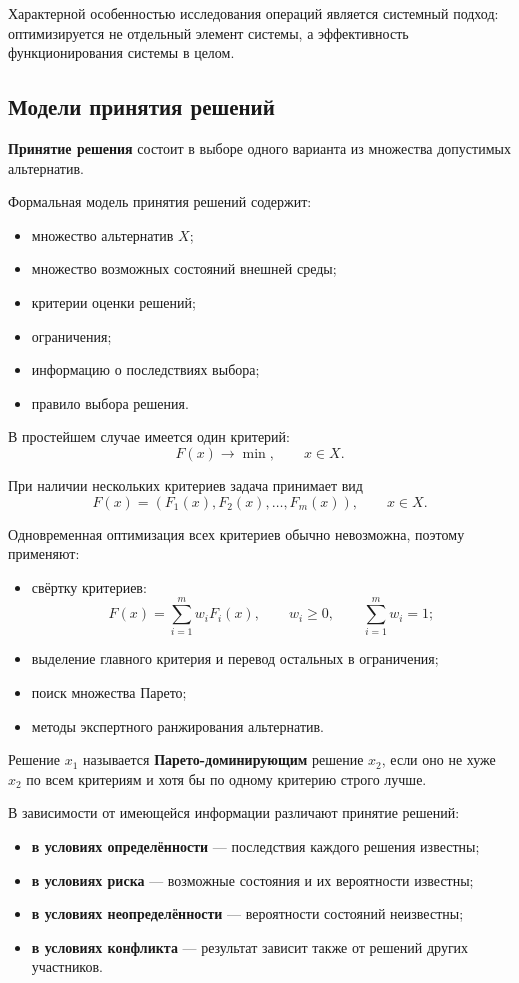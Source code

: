 Характерной особенностью исследования операций является системный подход: оптимизируется не отдельный элемент системы, а эффективность функционирования системы в целом.

\subsection{Модели принятия решений}

\textbf{Принятие решения} состоит в выборе одного варианта из множества допустимых альтернатив.

Формальная модель принятия решений содержит:
\begin{itemize}
	\item множество альтернатив $X$;
	\item множество возможных состояний внешней среды;
	\item критерии оценки решений;
	\item ограничения;
	\item информацию о последствиях выбора;
	\item правило выбора решения.
\end{itemize}

В простейшем случае имеется один критерий:
\[
F(x)\rightarrow \min,\qquad x\in X.
\]

При наличии нескольких критериев задача принимает вид
\[
F(x)=
\left(
F_1(x),F_2(x),\ldots,F_m(x)
\right),
\qquad x\in X.
\]

Одновременная оптимизация всех критериев обычно невозможна, поэтому применяют:
\begin{itemize}
	\item свёртку критериев:
	\[
	F(x)=\sum_{i=1}^{m}w_iF_i(x),
	\qquad
	w_i\geq 0,
	\qquad
	\sum_{i=1}^{m}w_i=1;
	\]
	\item выделение главного критерия и перевод остальных в ограничения;
	\item поиск множества Парето;
	\item методы экспертного ранжирования альтернатив.
\end{itemize}

Решение $x_1$ называется \textbf{Парето-доминирующим} решение $x_2$, если оно не хуже $x_2$ по всем критериям и хотя бы по одному критерию строго лучше.

В зависимости от имеющейся информации различают принятие решений:
\begin{itemize}
	\item \textbf{в условиях определённости} --- последствия каждого решения известны;
	\item \textbf{в условиях риска} --- возможные состояния и их вероятности известны;
	\item \textbf{в условиях неопределённости} --- вероятности состояний неизвестны;
	\item \textbf{в условиях конфликта} --- результат зависит также от решений других участников.
\end{itemize}

